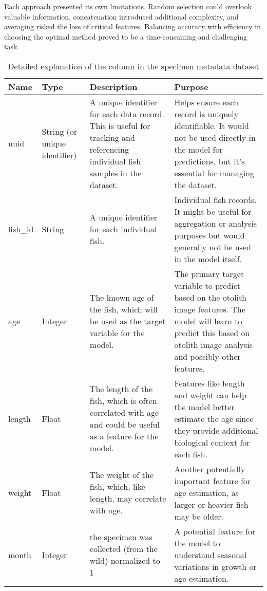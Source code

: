 Each approach presented its own limitations.
Random selection could overlook valuable information, concatenation introduced additional complexity, and averaging risked the loss of critical features.
Balancing accuracy with efficiency in choosing the optimal method proved to be a time-consuming and challenging task.


\pagebreak

\begin{longtable}{| p{} | p{} | p{} | p{} |}
    \caption{Detailed explanation of the column in the specimen metadata dataset}
    \label{tab:features} \\
    \hline
    \textbf{Name} &
    \textbf{Type} &
    \textbf{Description} &
    \textbf{Purpose} \\
    \hline
    \hline
    uuid &
    String (or unique identifier) & A unique identifier for each data record.
    This is useful for tracking and referencing individual fish samples in the dataset. &
    Helps ensure each record is uniquely identifiable.
    It would not be used directly in the model for predictions, but it's essential for managing the dataset.  \\
    \hline
    fish\_id &
    String &
    A unique identifier for each individual fish. &
    Individual fish records.
    It might be useful for aggregation or analysis purposes but would generally not be used in the model itself. \\
    \hline
    age &
    Integer & The known age of the fish, which will be used as the target variable for the model. &
    The primary target variable to predict based on the otolith image features.
    The model will learn to predict this based on otolith image analysis and possibly other features. \\
    \hline
    length &
    Float &
    The length of the fish, which is often correlated with age and could be useful as a feature for the model. &
    Features like length and weight can help the model better estimate the age since they provide additional biological context for each fish. \\
    \hline
    weight &
    Float &
    The weight of the fish, which, like length, may correlate with age. &
    Another potentially important feature for age estimation, as larger or heavier fish may be older. \\
    \hline
    month &
    Integer &
    the specimen was collected (from the wild) normalized to 1 &
    A potential feature for the model to understand seasonal variations in growth or age estimation. \\

\end{longtable}
